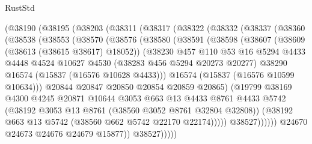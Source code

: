 \begin{lexlean}{RustStd}
\begin{coremodule}
{\begin{coremodule}
{{{{{{{{{{{{{{{{{{{{{{{{{{{{{{{{{{{{{{{{{{{{{{{{{{{{{{{{{{{{    (@38190
      (@38195
        (@38203
          (@38311
            (@38317
              (@38322
                (@38332
                  (@38337
                    (@38360
                      (@38538
                        (@38553
                          (@38570
                            (@38576
                              (@38580
                                (@38591
                                  (@38598
                                    (@38607
                                      (@38609 (@38613 (@38615 @38617) @18052))
                                      (@38230
                                        @457
                                        @110
                                        @53
                                        @16
                                        @5294
                                        @4433
                                        @4448
                                        @4524
                                        @10627
                                        @4530
                                        (@38283 @456 @5294 @20273 @20277)
                                        @38290
                                        @16574
                                        (@15837 (@16576 @10628 @4433)))
                                      @16574
                                      (@15837 (@16576 @10599 @10634)))
                                    @20844
                                    @20847
                                    @20850
                                    @20854
                                    @20859
                                    @20865)
                                  (@19799
                                    @38169
                                    @4300
                                    @4245
                                    @20871
                                    @10644
                                    @3053
                                    @663
                                    @13
                                    @4433
                                    @8761
                                    @4433
                                    @5742
                                    (@38192 @3053 @13 @8761 (@38560 @3052 @8761 @32804 @32808))
                                    (@38192 @663 @13 @5742 (@38560 @662 @5742 @22170 @22174)))))
                              @38527))))))
                  @24670
                  @24673
                  @24676
                  @24679
                  @15877))
              @38527)))))
}}}}}}}}}}}}}}}}}}}}}}}}}}}}}}}}}}}}}}}}}}}}}}}}}}}}}}}}}}}}
\end{coremodule}}
\end{coremodule}
\end{lexlean}
